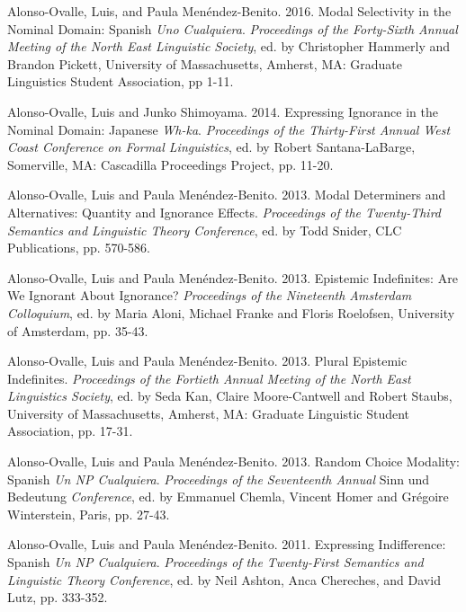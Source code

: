 \documentclass[11pt]{article}
\begin{document}
Alonso-Ovalle, Luis, and Paula Men\'endez-Benito. 2016. Modal Selectivity
in the Nominal Domain: Spanish \textit{Uno Cualquiera}. \textit{Proceedings
of the Forty-Sixth Annual Meeting of the North East Linguistic Society},
ed. by Christopher Hammerly and Brandon Pickett, University of Massachusetts, Amherst, MA: Graduate Linguistics Student Association, pp 1-11.

Alonso-Ovalle, Luis and Junko Shimoyama. 2014. Expressing Ignorance
in the Nominal Domain: Japanese \textit{Wh-ka}. \textit{Proceedings of
  the Thirty-First Annual West Coast Conference on Formal Linguistics}, ed. by Robert
Santana-LaBarge, Somerville, MA: Cascadilla Proceedings Project, pp. 11-20.

Alonso-Ovalle, Luis and Paula
Men\'endez-Benito. 2013. Modal Determiners and Alternatives:
Quantity and Ignorance Effects.  \textit{Proceedings of the Twenty-Third
  Semantics and Linguistic Theory Conference}, ed. by Todd Snider, CLC
Publications, pp. 570-586. %

Alonso-Ovalle, Luis and Paula
Men\'endez-Benito. 2013. Epistemic Indefinites: Are We Ignorant About
Ignorance? \textit{Proceedings of the Nineteenth Amsterdam Colloquium},
ed. by Maria Aloni, Michael Franke and Floris Roelofsen, University of
Amsterdam, pp. 35-43.

Alonso-Ovalle, Luis and Paula
Men\'endez-Benito. 2013. Plural Epistemic
  Indefinites.  \textit{Proceedings of the Fortieth Annual Meeting of the North East Linguistics
    Society}, ed. by Seda Kan, Claire Moore-Cantwell and Robert
  Staubs, University of Massachusetts, Amherst, MA: Graduate Linguistic Student Association, pp. 17-31.

Alonso-Ovalle, Luis and Paula Men\'endez-Benito. 2013. Random
Choice Modality: Spanish \textit{Un {\em NP}
  Cualquiera}. \textit{Proceedings of the Seventeenth Annual} Sinn und Bedeutung \textit{Conference}, ed. by
Emmanuel Chemla, Vincent Homer and Gr\'egoire Winterstein, Paris, pp. 27-43.

Alonso-Ovalle, Luis and Paula Men\'endez-Benito. 2011. Expressing Indifference: Spanish
\textit{Un {\em NP} Cualquiera}. \textit{Proceedings of the Twenty-First
  Semantics and Linguistic Theory Conference}, ed. by Neil Ashton,
Anca Chereches, and David Lutz, pp. 333-352. 
\end{document}
